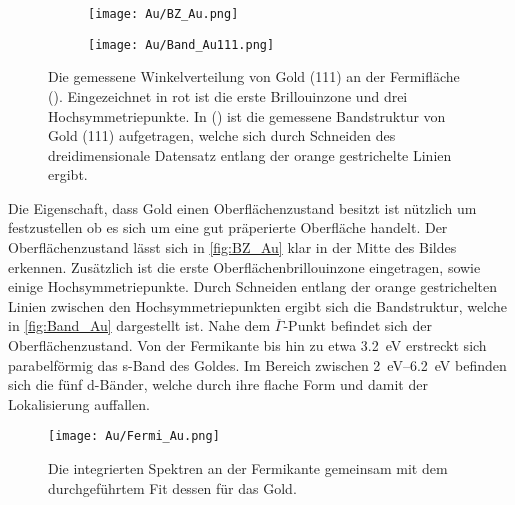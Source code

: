         \begin{figure}
            \centering
            \begin{subfigure}[t]{0.34\textwidth}
                \centering
                \texttt{[image: Au/BZ\_Au.png]}
                \subcaption{}
                \label{fig:BZ_Au}
            \end{subfigure}
            \begin{subfigure}[t]{0.62\textwidth}
                \centering
                \texttt{[image: Au/Band\_Au111.png]}
                \subcaption{}
                \label{fig:Band_Au}
            \end{subfigure}
            \caption{Die gemessene Winkelverteilung von Gold (111) an der Fermifläche ().
            Eingezeichnet in rot ist die erste Brillouinzone und drei Hochsymmetriepunkte.
            In () ist die gemessene Bandstruktur von Gold (111) aufgetragen, welche sich durch Schneiden des dreidimensionale Datensatz entlang der orange gestrichelte Linien ergibt.}
        \end{figure}
        Die Eigenschaft, dass Gold einen Oberflächenzustand besitzt ist nützlich um festzustellen ob es sich um eine gut präperierte Oberfläche handelt.
        Der Oberflächenzustand lässt sich in \autoref{fig:BZ_Au} klar in der Mitte des Bildes erkennen.
        Zusätzlich ist die erste Oberflächenbrillouinzone eingetragen, sowie einige Hochsymmetriepunkte.
        Durch Schneiden entlang der orange gestrichelten Linien zwischen den Hochsymmetriepunkten ergibt sich die Bandstruktur, welche in \autoref{fig:Band_Au} dargestellt ist.
        Nahe dem $\overline{\Gamma}$-Punkt befindet sich der Oberflächenzustand.
        Von der Fermikante bis hin zu etwa \SI{3.2}{\electronvolt} erstreckt sich parabelförmig das s-Band des Goldes.
        Im Bereich zwischen \SIrange{2}{6.2}{\electronvolt} befinden sich die fünf d-Bänder, welche durch ihre flache Form und damit der Lokalisierung auffallen.

        \begin{figure}
            \centering
            \texttt{[image: Au/Fermi\_Au.png]}
            \caption{Die integrierten Spektren an der Fermikante gemeinsam mit dem durchgeführtem Fit dessen für das Gold.}
            \label{fig:Fermi_Au}
        \end{figure}

